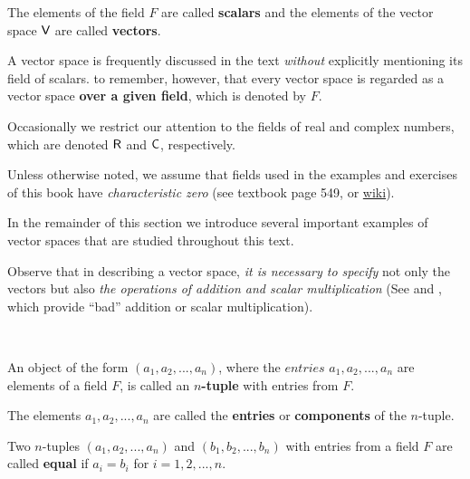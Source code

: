 \begin{note}
The elements of the field \(F\) are called \textbf{scalars} and the elements of the vector space \(\textsf{V}\) are called \textbf{vectors}.
\end{note}

\begin{remark}
A vector space is frequently discussed in the text \emph{without} explicitly mentioning its field of scalars.
 to remember, however, that every vector space is regarded as a vector space \textbf{over a given field}, which
is denoted by \(F\).

Occasionally we restrict our attention to the fields of real and complex numbers, which are denoted \(\textsf{R}\) and \(\textsf{C}\), respectively.
\end{remark}

\begin{remark}
Unless otherwise noted, we assume that fields used in the examples and exercises of this book have \emph{characteristic zero} (see textbook page 549, or \href{https://www.wikiwand.com/en/Characteristic_(algebra)}{wiki}).
\end{remark}

In the remainder of this section we introduce several important examples of vector spaces that are studied throughout this text.

\begin{remark}
Observe that in describing a vector space, \textit{it is necessary to specify} not only the vectors but also \textit{the operations of addition and scalar multiplication} (See  and , which provide ``bad'' addition or scalar multiplication).
\end{remark}

\begin{additional definition} \label{adef 1.1} \ 

 An object of the form \((a_1, a_2, ..., a_n)\), where the \(entries\) \(a_1, a_2, ..., a_n\) are elements of a field \(F\), is called an \textbf{\(n\)-tuple} with entries from \(F\).

 The elements \(a_1, a_2, ..., a_n\) are called the \textbf{entries} or \textbf{components} of the \(n\)-tuple.

 Two \(n\)-tuples \((a_1, a_2, ..., a_n)\) and \((b_1, b_2, ..., b_n)\) with entries from a field \(F\) are called \textbf{equal} if \(a_i = b_i\) for \(i = 1, 2, ..., n\).
\end{additional definition}

